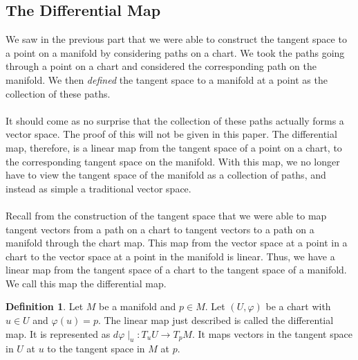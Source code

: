 \documentclass[]{article}
\let\phi\varphi %
\newcommand\<{\ensuremath{\left\langle}}
\renewcommand\>{\ensuremath{\right\rangle}}
\theoremstyle{definition}
\newtheorem{definition}{Definition}[section]
\theoremstyle{definition}
\begin{document}
	\subsection*{The Differential Map}
	We saw in the previous part that we were able to construct the tangent space to a point on a manifold by considering paths on a chart. We took the paths going through a point on a chart and considered the corresponding path on the manifold. We then \textit{defined} the tangent space to a manifold at a point as the collection of these paths.\\
	\\
	It should come as no surprise that the collection of these paths actually forms a vector space. The proof of this will not be given in this paper. The differential map, therefore, is a linear map from the tangent space of a point on a chart, to the corresponding tangent space on the manifold. With this map, we no longer have to view the tangent space of the manifold as a collection of paths, and instead as simple a traditional vector space.\\
	\\
	Recall from the construction of the tangent space that we were able to map tangent vectors from a path on a chart to tangent vectors to a path on a manifold through the chart map. This map from the vector space at a point in a chart to the vector space at a point in the manifold is linear. Thus, we have a linear map from the tangent space of a chart to the tangent space of a manifold. We call this map the differential map.
	\begin{definition}
		Let $M$ be a manifold and $p \in M$. Let $(U, \phi)$ be a chart with $u \in U$ and $\phi(u) = p$. The linear map just described is called the differential map. It is represented as $d\phi\mid_u : T_uU \to T_pM$. It maps vectors in the tangent space in $U$ at $u$ to the tangent space in $M$ at $p$.
	\end{definition}
	
	
\end{document}
